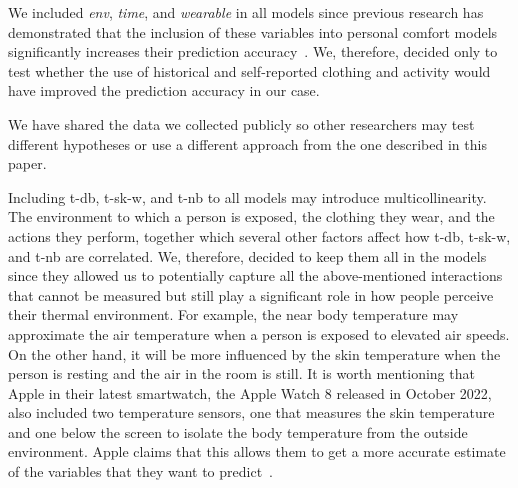 We included \textit{env}, \textit{time}, and \textit{wearable} in all models since previous research has demonstrated that the inclusion of these variables into personal comfort models significantly increases their prediction accuracy~\cite{Liu2019a}.
We, therefore, decided only to test whether the use of historical and self-reported clothing and activity would have improved the prediction accuracy in our case.

We have shared the data we collected publicly so other researchers may test different hypotheses or use a different approach from the one described in this paper.

Including \acf{t-db}, \acf{t-sk-w}, and \acf{t-nb} to all models may introduce multicollinearity.
The environment to which a person is exposed, the clothing they wear, and the actions they perform, together which several other factors affect how \acf{t-db}, \acf{t-sk-w}, and \acf{t-nb} are correlated.
We, therefore, decided to keep them all in the models since they allowed us to potentially capture all the above-mentioned interactions that cannot be measured but still play a significant role in how people perceive their thermal environment.
For example, the near body temperature may approximate the air temperature when a person is exposed to elevated air speeds. On the other hand, it will be more influenced by the skin temperature when the person is resting and the air in the room is still. 
It is worth mentioning that Apple in their latest smartwatch, the Apple Watch 8 released in October 2022, also included two temperature sensors, one that measures the skin temperature and one below the screen to isolate the body temperature from the outside environment. 
Apple claims that this allows them to get a more accurate estimate of the variables that they want to predict~\cite{apple2022}.

